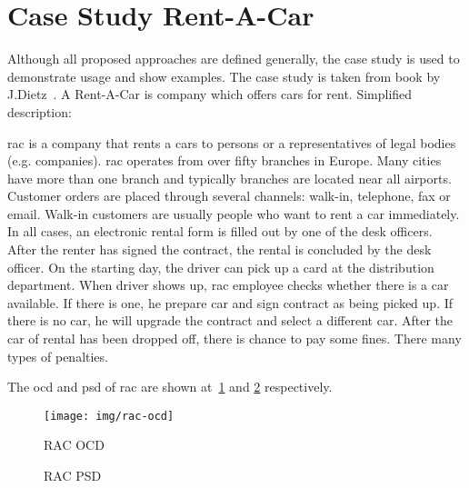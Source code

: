 
\section{Case Study Rent-A-Car}
Although all proposed approaches are defined generally, the case study is used to demonstrate usage and show examples. The case study is taken from book by J.Dietz~\cite{dietz-essence-2015}. A Rent-A-Car is company which offers cars for rent. Simplified description:

\gls{rac} is a company that rents a cars to persons or a representatives of legal bodies (e.g. companies). \gls{rac} operates from over fifty branches in Europe. Many cities have more than one branch and typically branches are located near all airports. 
Customer orders are placed through several channels: walk-in, telephone, fax or email. Walk-in customers are usually people who want to rent a car immediately. In all cases, an electronic rental form is filled out by one of the desk officers. 
After the renter has signed the contract, the rental is concluded by the desk officer. On the starting day, the driver can pick up a card at the distribution department. When driver shows up, \gls{rac} employee checks whether there is a car available. If there is one, he prepare car and sign contract as being picked up. If there is no car, he will upgrade the contract and select a different car. 
After the car of rental has been dropped off, there is chance to pay some fines. There many types of penalties.

The \gls{ocd} and \gls{psd} of \gls{rac} are shown at~\cref{fig:rac-ocd} and \cref{fig:rac-psd} respectively.
\begin{figure}[ht!]
\centering
\texttt{[image: img/rac-ocd]}
\caption{RAC OCD}
\label{fig:rac-ocd}
\end{figure}

\begin{figure}[ht!]
 \centering
 \qquad
 \caption{RAC PSD}%
 \label{fig:rac-psd}%
\end{figure}
\newpage

